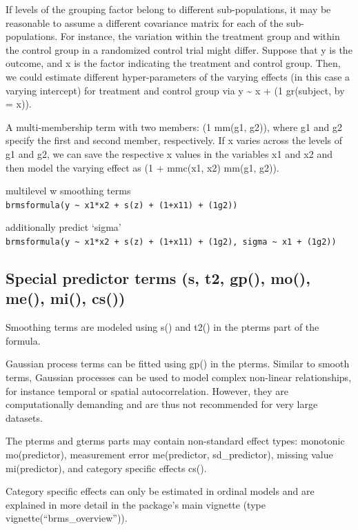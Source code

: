 \documentclass[]{book}
\begin{document}
If levels of the grouping factor belong to different sub-populations, it
may be reasonable to assume a different covariance matrix for each of
the sub-populations. For instance, the variation within the treatment
group and within the control group in a randomized control trial might
differ. Suppose that y is the outcome, and x is the factor indicating
the treatment and control group. Then, we could estimate different
hyper-parameters of the varying effects (in this case a varying
intercept) for treatment and control group via y \textasciitilde{} x +
(1 \textbar{} gr(subject, by = x)).

A multi-membership term with two members: (1 \textbar{} mm(g1, g2)),
where g1 and g2 specify the first and second member, respectively. If x
varies across the levels of g1 and g2, we can save the respective x
values in the variables x1 and x2 and then model the varying effect as
(1 + mmc(x1, x2) \textbar{} mm(g1, g2)).

multilevel w smoothing terms
\texttt{brmsformula(y\ \textasciitilde{}\ x1*x2\ +\ s(z)\ +\ (1+x1\textbar{}1)\ +\ (1\textbar{}g2))}

additionally predict `sigma'
\texttt{brmsformula(y\ \textasciitilde{}\ x1*x2\ +\ s(z)\ +\ (1+x1\textbar{}1)\ +\ (1\textbar{}g2),\ sigma\ \textasciitilde{}\ x1\ +\ (1\textbar{}g2))}

\subsection{Special predictor terms (s, t2, gp(), mo(), me(), mi(),
cs())}\label{special-predictor-terms-s-t2-gp-mo-me-mi-cs}

Smoothing terms are modeled using s() and t2() in the pterms part of the
formula.

Gaussian process terms can be fitted using gp() in the pterms. Similar
to smooth terms, Gaussian processes can be used to model complex
non-linear relationships, for instance temporal or spatial
autocorrelation. However, they are computationally demanding and are
thus not recommended for very large datasets.

The pterms and gterms parts may contain non-standard effect types:
monotonic mo(predictor), measurement error me(predictor, sd\_predictor),
missing value mi(predictor), and category specific effects cs().

Category specific effects can only be estimated in ordinal models and
are explained in more detail in the package's main vignette (type
vignette(``brms\_overview'')).
\end{document}
